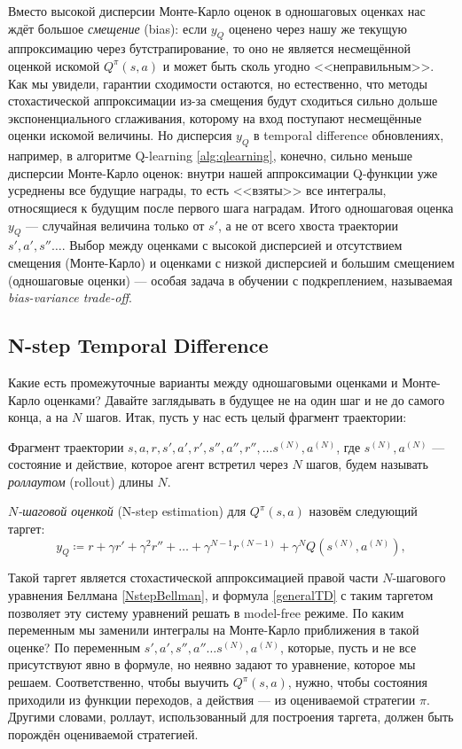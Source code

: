 Вместо высокой дисперсии Монте-Карло оценок в одношаговых оценках нас ждёт большое \emph{смещение} (bias): если $y_Q$ оценено через нашу же текущую аппроксимацию через бутстрапирование, то оно не является несмещённой оценкой искомой $Q^{\pi}(s, a)$ и может быть сколь угодно <<неправильным>>. Как мы увидели, гарантии сходимости остаются, но естественно, что методы стохастической аппроксимации из-за смещения будут сходиться сильно дольше экспоненциального сглаживания, которому на вход поступают несмещённые оценки искомой величины. Но дисперсия $y_Q$ в temporal difference обновлениях, например, в алгоритме Q-learning \ref{alg:qlearning}, конечно, сильно меньше дисперсии Монте-Карло оценок: внутри нашей аппроксимации Q-функции уже усреднены все будущие награды, то есть <<взяты>> все интегралы, относящиеся к будущим после первого шага наградам. Итого одношаговая оценка $y_Q$ --- случайная величина только от $s'$, а не от всего хвоста траектории $s', a', s'' \dots$. Выбор между оценками с высокой дисперсией и отсутствием смещения (Монте-Карло) и оценками с низкой дисперсией и большим смещением (одношаговые оценки) --- особая задача в обучении с подкреплением, называемая \emph{bias-variance trade-off}.

\subsection{N-step Temporal Difference}

Какие есть промежуточные варианты между одношаговыми оценками и Монте-Карло оценками? Давайте заглядывать в будущее не на один шаг и не до самого конца, а на $N$ шагов. Итак, пусть у нас есть целый фрагмент траектории:

\begin{definition}
Фрагмент траектории $s, a, r, s', a', r', s'', a'', r'', \dots s^{(N)}, a^{(N)}$, где $s^{(N)}, a^{(N)}$ --- состояние и действие, которое агент встретил через $N$ шагов, будем называть \emph{роллаутом} (rollout) длины $N$.
\end{definition}

\begin{definition}
\emph{$N$-шаговой оценкой} (N-step estimation) для $Q^{\pi}(s, a)$ назовём следующий таргет:
$$y_Q \coloneqq r + \gamma r' + \gamma^2 r'' + \dots + \gamma^{N-1} r^{(N-1)} + \gamma^N Q(s^{(N)}, a^{(N)}),$$
\end{definition}

Такой таргет является стохастической аппроксимацией правой части $N$-шагового уравнения Беллмана \eqref{NstepBellman}, и формула \eqref{generalTD} с таким таргетом позволяет эту систему уравнений решать в model-free режиме. По каким переменным мы заменили интегралы на Монте-Карло приближения в такой оценке? По переменным $s', a', s'', a'' \dots s^{(N)}, a^{(N)}$, которые, пусть и не все присутствуют явно в формуле, но неявно задают то уравнение, которое мы решаем. Соответственно, чтобы выучить $Q^{\pi}(s, a)$, нужно, чтобы состояния приходили из функции переходов, а действия --- из оцениваемой стратегии $\pi$. Другими словами, роллаут, использованный для построения таргета, должен быть порождён оцениваемой стратегией.

